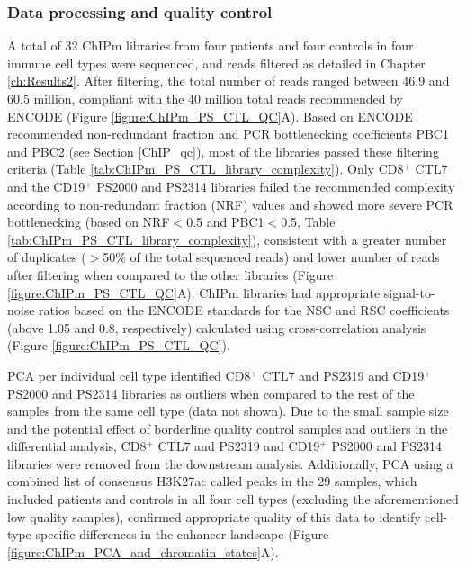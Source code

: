 \subsubsection{Data processing and quality control}

A total of 32 ChIPm libraries from four patients and four controls in four immune cell types were sequenced, and reads filtered as detailed in Chapter \ref{ch:Results2}. After filtering, the total number of reads ranged between 46.9 and 60.5 million, compliant with the 40 million total reads recommended by ENCODE (Figure \ref{figure:ChIPm_PS_CTL_QC}A). Based on ENCODE recommended non-redundant fraction and PCR bottlenecking coefficients PBC1 and PBC2 (see Section \ref{ChIP_qc}), most of the libraries passed these filtering criteria (Table \ref{tab:ChIPm_PS_CTL_library_complexity}). Only CD8$^+$ CTL7 and the CD19$^+$ PS2000 and PS2314 libraries failed the recommended complexity according to non-redundant fraction (NRF) values and showed more severe PCR bottlenecking (based on NRF$<$0.5 and PBC1$<$0.5, Table \ref{tab:ChIPm_PS_CTL_library_complexity}), consistent with a greater number of duplicates ($>$50\% of the total sequenced reads) and lower number of reads after filtering when compared to the other libraries (Figure \ref{figure:ChIPm_PS_CTL_QC}A). ChIPm libraries had appropriate signal-to-noise ratios based on the ENCODE standards \parencite{Landt2012} for the NSC and RSC coefficients (above 1.05 and 0.8, respectively) calculated using cross-correlation analysis (Figure \ref{figure:ChIPm_PS_CTL_QC}).

PCA per individual cell type identified CD8$^+$ CTL7 and PS2319 and CD19$^+$ PS2000 and PS2314 libraries as outliers when compared to the rest of the samples from the same cell type (data not shown). Due to the small sample size and the potential effect of borderline quality control samples and outliers in the differential analysis, CD8$^+$ CTL7 and PS2319 and CD19$^+$ PS2000 and PS2314 libraries were removed from the downstream analysis. Additionally, PCA using a combined list of consensus H3K27ac called peaks in the 29 samples, which included patients and controls in all four cell types (excluding the aforementioned low quality samples), confirmed appropriate quality of this data to identify cell-type specific differences in the enhancer landscape (Figure \ref{figure:ChIPm_PCA_and_chromatin_states}A). 
 

